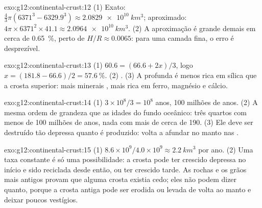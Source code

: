 \begin{solution}{exo:g12:continental-crust:12}
(1) Exato: $\tfrac{4}{3}\pi(6371^3 - 6329.9^3) \approx
\qty{2.0829e10}{km^3}$; aproximado: $4\pi \times 6371^2 \times 41.1
\approx \qty{2.0964e10}{km^3}$. (2) A aproximação é grande demais em cerca
de \qty{0.65}{\percent}, perto de $H/R \approx 0.0065$: para uma camada
fina, o erro é desprezível.
\end{solution}

\begin{solution}{exo:g12:continental-crust:13}
(1) $60.6 = (66.6 + 2x)/3$, logo $x = (181.8 - 66.6)/2 = \qty{57.6}{\percent}$.
(2) . (3) A  profunda é menos rica em sílica
que a crosta superior: mais minerais , mais rica em ferro, magnésio e
cálcio.
\end{solution}

\begin{solution}{exo:g12:continental-crust:14}
(1) $3 \times 10^8/3 = 10^8$ anos, 100 milhões de anos. (2) A mesma ordem de
grandeza que as idades do fundo oceânico: três quartos com menos de 100
milhões de anos, nada com mais de cerca de 190. (3) Ele deve ser destruído
tão depressa quanto é produzido: volta a afundar no manto nas .
\end{solution}

\begin{solution}{exo:g12:continental-crust:15}
(1) $8.6 \times 10^9 / 4.0 \times 10^9 \approx \qty{2.2}{km^3}$ por ano.
(2) Uma taxa constante é só uma possibilidade: a crosta pode ter crescido
depressa no início e sido reciclada desde então, ou ter crescido tarde. As
rochas e os grãos mais antigos provam que alguma crosta existia cedo; eles
não podem dizer quanto, porque a crosta antiga pode ser erodida ou levada de
volta ao manto e deixar poucos vestígios.
\end{solution}

